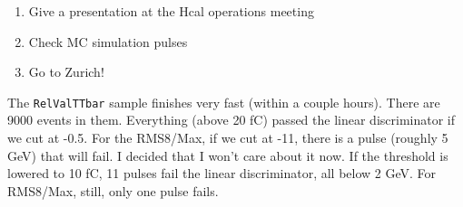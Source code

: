 

\begin{enumerate}
\item Give a presentation at the Hcal operations meeting
\item Check MC simulation pulses
\item Go to Zurich!
\end{enumerate}


The \texttt{RelValTTbar} sample finishes very fast (within a couple hours).  There are 9000 events in them.
Everything (above 20 fC) passed the linear discriminator if we cut at -0.5.  For the RMS8/Max, if we cut at -11,
there is a pulse (roughly 5 GeV) that will fail.  I decided that I won't care about it now.
If the threshold is lowered to 10 fC, 11 pulses fail the linear discriminator, all below 2 GeV.
For RMS8/Max, still, only one pulse fails.
